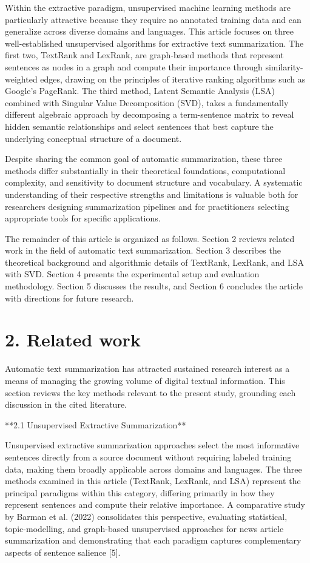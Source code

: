 \documentclass[10pt]{book}
\begin{document}
Within the extractive paradigm, unsupervised machine learning methods are particularly attractive because they require no annotated training data and can generalize across diverse domains and languages. This article focuses on three well-established unsupervised algorithms for extractive text summarization. The first two, TextRank and LexRank, are graph-based methods that represent sentences as nodes in a graph and compute their importance through similarity-weighted edges, drawing on the principles of iterative ranking algorithms such as Google's PageRank. The third method, Latent Semantic Analysis (LSA) combined with Singular Value Decomposition (SVD), takes a fundamentally different algebraic approach by decomposing a term-sentence matrix to reveal hidden semantic relationships and select sentences that best capture the underlying conceptual structure of a document.

Despite sharing the common goal of automatic summarization, these three methods differ substantially in their theoretical foundations, computational complexity, and sensitivity to document structure and vocabulary. A systematic understanding of their respective strengths and limitations is valuable both for researchers designing summarization pipelines and for practitioners selecting appropriate tools for specific applications.

The remainder of this article is organized as follows. Section 2 reviews related work in the field of automatic text summarization. Section 3 describes the theoretical background and algorithmic details of TextRank, LexRank, and LSA with SVD. Section 4 presents the experimental setup and evaluation methodology. Section 5 discusses the results, and Section 6 concludes the article with directions for future research.

\section{2. Related work}

Automatic text summarization has attracted sustained research interest as a means of managing the growing volume of digital textual information. This section reviews the key methods relevant to the present study, grounding each discussion in the cited literature.

**2.1 Unsupervised Extractive Summarization**

Unsupervised extractive summarization approaches select the most informative sentences directly from a source document without requiring labeled training data, making them broadly applicable across domains and languages. The three methods examined in this article (TextRank, LexRank, and LSA) represent the principal paradigms within this category, differing primarily in how they represent sentences and compute their relative importance. A comparative study by Barman et al. (2022) consolidates this perspective, evaluating statistical, topic-modelling, and graph-based unsupervised approaches for news article summarization and demonstrating that each paradigm captures complementary aspects of sentence salience [5].
\end{document}
